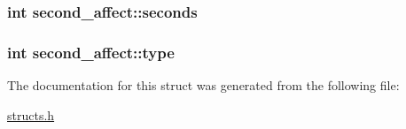\hypertarget{structsecond__affect_a1733466c66a4c38c8827ea8f04ebb95c}{
\subsubsection[{seconds}]{\setlength{\rightskip}{0pt plus 5cm}int second\-\_\-affect\-::seconds}}\label{structsecond__affect_a1733466c66a4c38c8827ea8f04ebb95c}
\hypertarget{structsecond__affect_a5fbce7cebaf58b39351eb73328961c8e}{
\subsubsection[{type}]{\setlength{\rightskip}{0pt plus 5cm}int second\-\_\-affect\-::type}}\label{structsecond__affect_a5fbce7cebaf58b39351eb73328961c8e}


The documentation for this struct was generated from the following file\-:\begin{DoxyCompactItemize}
\item 
\hyperlink{structs_8h}{structs.\-h}\end{DoxyCompactItemize}
